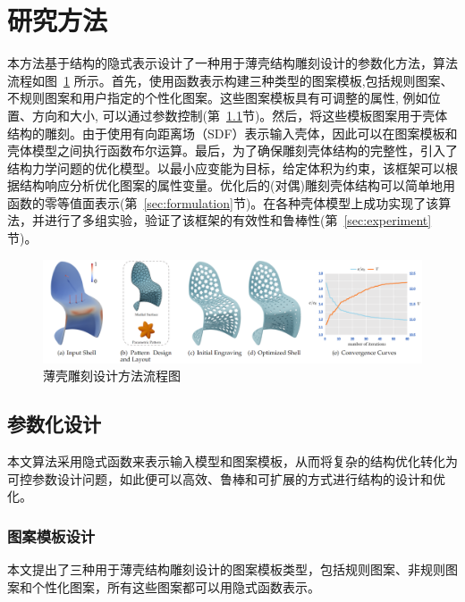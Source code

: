 \section{研究方法}

本方法基于结构的隐式表示设计了一种用于薄壳结构雕刻设计的参数化方法，算法流程如图~\ref{fig:thin-shell-pipeline} 所示。首先，使用函数表示构建三种类型的图案模板,包括规则图案、不规则图案和用户指定的个性化图案。这些图案模板具有可调整的属性, 例如位置、方向和大小, 可以通过参数控制(第~\ref{subsec:parametric-design}节)。然后，将这些模板图案用于壳体结构的雕刻。由于使用有向距离场（SDF）表示输入壳体，因此可以在图案模板和壳体模型之间执行函数布尔运算。最后，为了确保雕刻壳体结构的完整性，引入了结构力学问题的优化模型。以最小应变能为目标，给定体积为约束，该框架可以根据结构响应分析优化图案的属性变量。优化后的(对偶)雕刻壳体结构可以简单地用函数的零等值面表示(第~\ref{sec:formulation}节)。在各种壳体模型上成功实现了该算法，并进行了多组实验，验证了该框架的有效性和鲁棒性(第~\ref{sec:experiment}节)。


\begin{figure}[htbp]
    \centering
    \includegraphics[width=1.0\linewidth]{./figures/thin-shell-pipeline}
    \caption{薄壳雕刻设计方法流程图}
    \label{fig:thin-shell-pipeline}
\end{figure}


\subsection{参数化设计}
\label{subsec:parametric-design}
本文算法采用隐式函数来表示输入模型和图案模板，从而将复杂的结构优化转化为可控参数设计问题，如此便可以高效、鲁棒和可扩展的方式进行结构的设计和优化。

\subsubsection{图案模板设计}
本文提出了三种用于薄壳结构雕刻设计的图案模板类型，包括规则图案、非规则图案和个性化图案，所有这些图案都可以用隐式函数表示。

